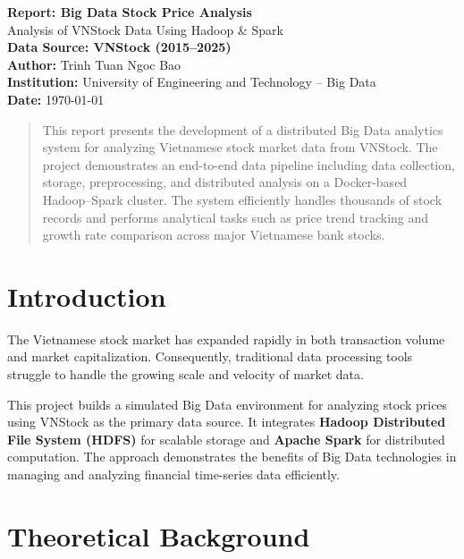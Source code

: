 \documentclass[12pt,a4paper]{article}
\begin{document}
\begin{titlepage}
\centering
{\LARGE \textbf{Report: Big Data Stock Price Analysis}}\\[2cm]
{\large Analysis of VNStock Data Using Hadoop \& Spark}\\[1cm]
{\large \textbf{Data Source: VNStock (2015–2025)}}\\[2cm]
\textbf{Author:} Trinh Tuan Ngoc Bao\\[0.5cm]
\textbf{Institution:} University of Engineering and Technology – Big Data\\[0.5cm]
\textbf{Date:} \today
\end{titlepage}

\tableofcontents
\newpage

\begin{abstract}
This report presents the development of a distributed Big Data analytics system for analyzing Vietnamese stock market data from VNStock.
The project demonstrates an end-to-end data pipeline including data collection, storage, preprocessing, and distributed analysis on a Docker-based Hadoop–Spark cluster.
The system efficiently handles thousands of stock records and performs analytical tasks such as price trend tracking and growth rate comparison across major Vietnamese bank stocks.
\end{abstract}

\section{Introduction}

The Vietnamese stock market has expanded rapidly in both transaction volume and market capitalization.  
Consequently, traditional data processing tools struggle to handle the growing scale and velocity of market data.  

This project builds a simulated Big Data environment for analyzing stock prices using VNStock as the primary data source.  
It integrates \textbf{Hadoop Distributed File System (HDFS)} for scalable storage and \textbf{Apache Spark} for distributed computation.  
The approach demonstrates the benefits of Big Data technologies in managing and analyzing financial time-series data efficiently.

\section{Theoretical Background}
\end{document}
